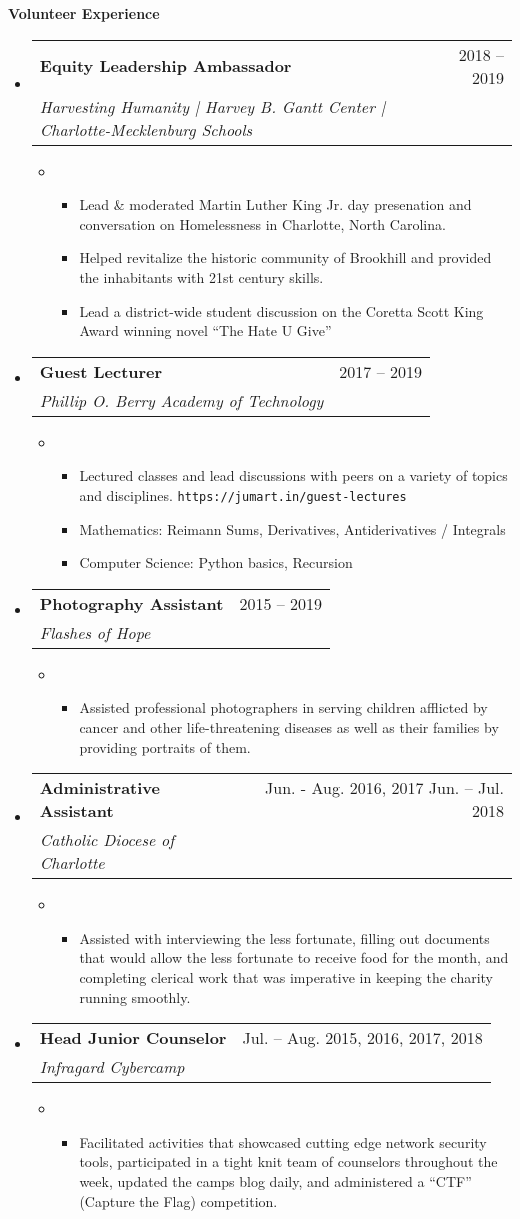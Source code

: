 \documentclass[letterpaper,10pt,draft]{article}
\makeatletter
\newlength{\outerbordwidth}
\newcommand{\openitem}[2]{\item[] \textbf{#1} #2\vspace{2pt}}
\newcommand{\secheading}[1]{\vspace{2pt}
	{
		\setlength{\FrameSep}{\outerbordwidth}
		\textbf{\large #1}
	}
}
\newcommand{\secsubheading}[4]{
\vspace{2pt}
\begin{tabular*}{6.86in}{l@{\cftdotfill{\cftsecdotsep}\extracolsep{\fill}}r}
		\textbf{#1} & #3 -- #4\\
		\textit{#2} \\
\end{tabular*}
}
\newcommand{\secitem}[5]{
	\item[]
		\secsubheading{#1}{#2}{#3}{#4}
		\vspace{-10pt}
		\begin{itemize}
			\item[]{#5}
		\end{itemize}
}
\makeatother
\begin{document}
\secheading{Volunteer Experience}
\begin{itemize}

	\secitem{Equity Leadership Ambassador}
		{Harvesting Humanity | Harvey B. Gantt Center | Charlotte-Mecklenburg Schools}
		{2018}{2019}
		{
	  	\begin{itemize}
		    \openitem{}{Lead \& moderated Martin Luther King Jr. day presenation and conversation on Homelessness in Charlotte, North Carolina.}
		    \openitem{}{Helped revitalize the historic community of Brookhill and provided the inhabitants with 21st century skills.}
		    \openitem{}{Lead a district-wide student discussion on the Coretta Scott King Award winning novel ``The Hate U Give''}
	   \end{itemize}
	  }

	\secitem{Guest Lecturer}
		{Phillip O. Berry Academy of Technology}
		{2017}{2019}
		{
		  \begin{itemize}
		    \openitem{}{Lectured classes and lead discussions with peers on a variety of topics and disciplines. \texttt{https://jumart.in/guest-lectures}}
		    \openitem{}{Mathematics: Reimann Sums, Derivatives, Antiderivatives / Integrals}
		    \openitem{}{Computer Science: Python basics, Recursion}
		  \end{itemize}
	  }
	\secitem{Photography Assistant}
		{Flashes of Hope}
		{2015}{2019}
		{
			\begin{itemize}
				\openitem{}{Assisted professional photographers in serving children afflicted by cancer and other life-threatening diseases as well as their families by providing portraits of them.}
			\end{itemize}
		}

	\secitem{Administrative Assistant}
		{Catholic Diocese of Charlotte}
		{Jun. - Aug. 2016, 2017 Jun.}{Jul. 2018}
		{
			\begin{itemize}
				\openitem{}{Assisted with interviewing the less fortunate, filling out documents that would allow the less fortunate to receive food for the month, and completing clerical work that was imperative in keeping the charity running smoothly.}
			\end{itemize}
		}
	\secitem{Head Junior Counselor}
		{Infragard Cybercamp}
		{Jul.}{Aug. 2015, 2016, 2017, 2018}
		{
			\begin{itemize}
				\openitem{}{Facilitated activities that showcased cutting edge network security tools, participated in a tight knit team of counselors throughout the week, updated the camps blog daily, and administered a “CTF” (Capture the Flag) competition.}
			\end{itemize}
		}

\end{itemize}



\end{document}
